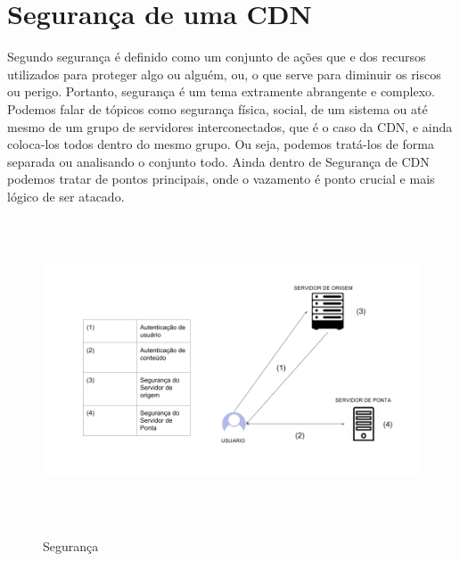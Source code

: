 \section{Seguran\c{c}a de uma CDN} \label{sec:seguranca}
Segundo \cite{ferreira2004novo} seguran\c{c}a \'e definido como um conjunto de a\c{c}\~oes que e dos recursos utilizados para proteger algo ou algu\'em, ou, o que serve para diminuir os riscos ou perigo. Portanto, seguran\c{c}a \'e um tema extramente abrangente e complexo. Podemos falar de t\'opicos como seguran\c{c}a f\'isica, social, de um sistema ou at\'e mesmo de um grupo de servidores interconectados, que \'e o caso da CDN, e ainda coloca-los todos dentro do mesmo grupo. Ou seja, podemos trat\'a-los de forma separada ou analisando o conjunto todo.
\newline 
Ainda dentro de Seguran\c{c}a de CDN podemos tratar de pontos principais, onde o vazamento \'e ponto crucial e mais l\'ogico de ser atacado. 
\begin{figure}[H]
\caption{Seguran\c{c}a}
\includegraphics[height=9cm]{Figuras/seguranca_intro.png} 
\label{figura:seguranca_intro}
\end{figure}


